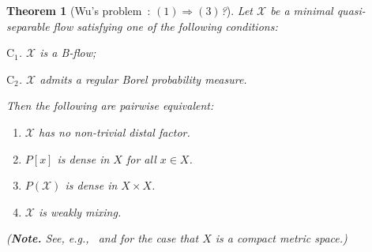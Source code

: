 \documentclass[12pt,final,3p,times]{elsarticle}
\newtheorem{sthm}{Theorem}[subsection]
\theoremstyle{definition}
\numberwithin{equation}{section}
\begin{document}
\begin{sthm}[{Wu's problem~\cite[Prob.~7, p.~518]{AG68}: \textit{$(1)\Rightarrow(3)$?}}]\label{Q5.10}
Let $\mathscr{X}$ be a minimal quasi-separable flow satisfying one of the following conditions:
\item $\mathrm{C}_1$. $\mathscr{X}$ is a \textsl{B}-flow;
\item $\mathrm{C}_2$. $\mathscr{X}$ admits a regular Borel probability measure.
\item Then the following are pairwise equivalent:
\begin{enumerate}[(1)]
\item $\mathscr{X}$ has no non-trivial distal factor.
\item $P[x]$ is dense in $X$ for all $x\in X$.
\item $P(\mathscr{X})$ is dense in $X\times X$.
\item $\mathscr{X}$ is weakly mixing.
\end{enumerate}
(\textbf{Note.} See, e.g.,~\cite[Thm.~9.13]{A88} and \cite{DeV} for the case that $X$ is a compact metric space.)
\end{sthm}
\end{document}
